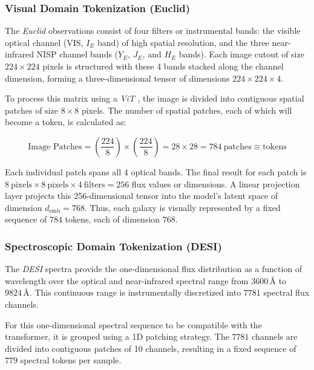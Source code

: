 \subsubsection{Visual Domain Tokenization (Euclid)}

The \textit{Euclid} observations consist of four filters or instrumental bands: the visible optical channel (VIS, $I_E$ band) of high spatial resolution, and the three near-infrared NISP channel bands ($Y_E$, $J_E$, and $H_E$ bands). Each image cutout of size $224 \times 224$ pixels is structured with these 4 bands stacked along the channel dimension, forming a three-dimensional tensor of dimensions $224 \times 224 \times 4$.

To process this matrix using a \textit{\gls{ViT}} \autocite{ar:dosovitskiy-2020}, the image is divided into contiguous spatial patches of size $8 \times 8$ pixels. The number of spatial patches, each of which will become a token, is calculated as:

\begin{equation}
\text{Image Patches} = \left(\dfrac{224}{8}\right) \times \left(\dfrac{224}{8}\right) = 28 \times 28 = 784\ \text{patches}\equiv\text{tokens}
\label{eq:tokens_imagen}
\end{equation}

Each individual patch spans all 4 optical bands. The final result for each patch is $8\ \text{pixels} \times 8\ \text{pixels} \times 4\ \text{filters} = 256$ flux values or dimensions. A linear projection layer projects this 256-dimensional tensor into the model's latent space of dimension $d_{\text{emb}}=768$. Thus, each galaxy is visually represented by a fixed sequence of $784$ tokens, each of dimension $768$.

\subsubsection{Spectroscopic Domain Tokenization (DESI)}

The \textit{\gls{DESI}} spectra provide the one-dimensional flux distribution as a function of wavelength over the optical and near-infrared spectral range from $3600\,\text{\AA{}}$ to $9824\,\text{\AA{}}$. This continuous range is instrumentally discretized into $7781$ spectral flux channels.

For this one-dimensional spectral sequence to be compatible with the transformer, it is grouped using a 1D patching strategy. The $7781$ channels are divided into contiguous patches of 10 channels, resulting in a fixed sequence of $779$ spectral tokens per sample.

